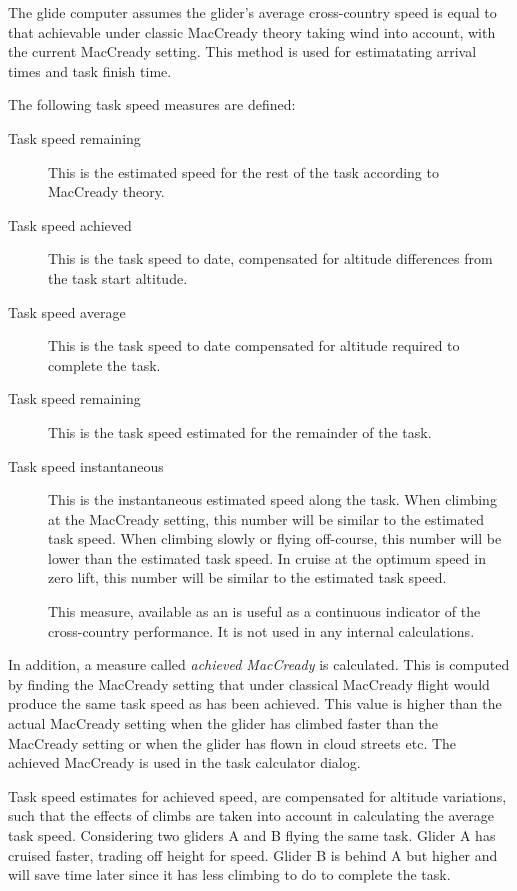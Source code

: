 \documentclass[a4paper,12pt]{refrep}
\begin{document}
The glide computer assumes the glider's average cross-country speed is
equal to that achievable under classic MacCready theory taking wind
into account, with the current MacCready setting.  This method is used
for estimatating arrival times and task finish time.

The following task speed measures are defined:
\begin{description}
\item[Task speed remaining]  This is the estimated speed for the rest of
the task according to MacCready theory.
\item[Task speed achieved]  This is the task speed to date, compensated
for altitude differences from the task start altitude.
\item[Task speed average]  This is the task speed to date compensated
for altitude required to complete the task. 
\item[Task speed remaining]  This is the task speed estimated for the
  remainder of the task.
\item[Task speed instantaneous]  This is the instantaneous estimated speed 
along the task.  When climbing at the MacCready setting, this number
will be similar to the estimated task speed.  When climbing slowly or
flying off-course, this number will be lower than the estimated task
speed.  In cruise at the optimum speed in zero lift, this number will
be similar to the estimated task speed.

This measure, available as an {\InfoBox} is useful as a continuous
indicator of the cross-country performance.  It is not used in any
internal calculations.
\end{description}

In addition, a measure called {\em achieved MacCready} is calculated.
This is computed by finding the MacCready setting that under classical
MacCready flight would produce the same task speed as has been
achieved.  This value is higher than the actual MacCready setting when
the glider has climbed faster than the MacCready setting or when the
glider has flown in cloud streets etc.  The achieved MacCready is used
in the task calculator dialog.

Task speed estimates for achieved speed, are compensated for altitude
variations, such that the effects of climbs are taken into account in
calculating the average task speed.  Considering two gliders A and B
flying the same task.  Glider A has cruised faster, trading off height
for speed.  Glider B is behind A but higher and will save time later
since it has less climbing to do to complete the task.
\end{document}
